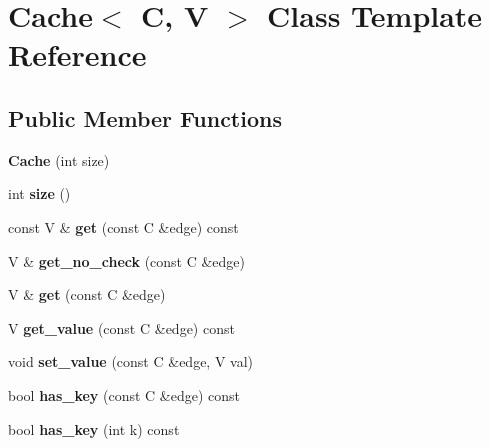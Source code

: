 \hypertarget{class_cache}{
\section{Cache$<$ C, V $>$ Class Template Reference}
\label{class_cache}
}
\subsection*{Public Member Functions}
\begin{DoxyCompactItemize}
\item 
\hypertarget{class_cache_ace98594381db6cd76b3228a73b18190a}{
{\bfseries Cache} (int size)}
\label{class_cache_ace98594381db6cd76b3228a73b18190a}

\item 
\hypertarget{class_cache_ad0a38f45b45b59a772d1e1fd92e59973}{
int {\bfseries size} ()}
\label{class_cache_ad0a38f45b45b59a772d1e1fd92e59973}

\item 
\hypertarget{class_cache_a8d126a64723abe79878befff1c622145}{
const V \& {\bfseries get} (const C \&edge) const }
\label{class_cache_a8d126a64723abe79878befff1c622145}

\item 
\hypertarget{class_cache_a2616bfc563def72da44f91977552ca62}{
V \& {\bfseries get\_\-no\_\-check} (const C \&edge)}
\label{class_cache_a2616bfc563def72da44f91977552ca62}

\item 
\hypertarget{class_cache_a9256aebb417928fbea6090f820d0652d}{
V \& {\bfseries get} (const C \&edge)}
\label{class_cache_a9256aebb417928fbea6090f820d0652d}

\item 
\hypertarget{class_cache_a509df0fde9598a4df9879b5ddb9d93d9}{
V {\bfseries get\_\-value} (const C \&edge) const }
\label{class_cache_a509df0fde9598a4df9879b5ddb9d93d9}

\item 
\hypertarget{class_cache_aeb9ab922add6cf79e2bef1b714f57e8a}{
void {\bfseries set\_\-value} (const C \&edge, V val)}
\label{class_cache_aeb9ab922add6cf79e2bef1b714f57e8a}

\item 
\hypertarget{class_cache_a0864be6a32d0840a4c3009f9ae417902}{
bool {\bfseries has\_\-key} (const C \&edge) const }
\label{class_cache_a0864be6a32d0840a4c3009f9ae417902}

\item 
\hypertarget{class_cache_a213273226c6bb403d33e10e2bc769fe1}{
bool {\bfseries has\_\-key} (int k) const }
\label{class_cache_a213273226c6bb403d33e10e2bc769fe1}

\end{DoxyCompactItemize}

